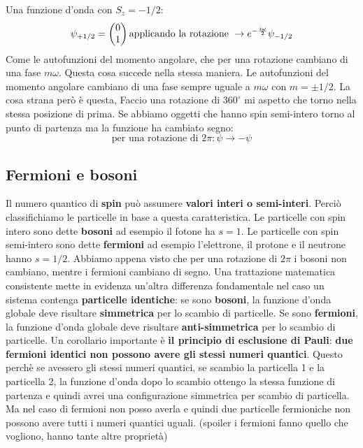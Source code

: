 Una funzione d'onda con $S_z=-1/2$: 
\begin{equation*}
    \psi_{+1/2}=\left(\begin{array}{@{}c@{}}
0 \\
1
\end{array}\right) \text{applicando la rotazione } \to e^{-\frac{i\omega}{2}} \psi_{-1/2}
\end{equation*}
Come le autofunzioni del momento angolare, che per una rotazione cambiano di una fase $m\omega$. Questa cosa succede nella stessa maniera. Le autofunzioni del momento angolare cambiano di una fase sempre uguale a $m\omega$ con $m=\pm 1/2$. La cosa strana però è questa, Faccio una rotazione di $360^\circ$ mi aspetto che torno nella stessa posizione di prima. Se abbiamo oggetti che hanno spin semi-intero torno al punto di partenza ma la funzione ha cambiato segno:
\begin{equation*}
    \text{per una rotazione di } 2\pi: \psi\to-\psi
\end{equation*}
\subsection{Fermioni e bosoni}
Il numero quantico di \textbf{spin} può assumere \textbf{valori interi o semi-interi}. Perciò classifichiamo le particelle in base a questa caratteristica. Le particelle con spin intero sono dette \textbf{bosoni} ad esempio il fotone ha $s=1$. Le particelle con spin semi-intero sono dette \textbf{fermioni} ad esempio l'elettrone, il protone e il neutrone hanno $s=1/2$. Abbiamo appena visto che per una rotazione di $2\pi$ i bosoni non cambiano, mentre i fermioni cambiano di segno. Una trattazione matematica consistente mette in evidenza un'altra differenza fondamentale nel caso un sistema contenga \textbf{particelle identiche}: se sono \textbf{bosoni}, la funzione d'onda globale deve risultare \textbf{simmetrica} per lo scambio di particelle. Se sono \textbf{fermioni}, la funzione d'onda globale deve risultare \textbf{anti-simmetrica} per lo scambio di particelle. Un corollario importante è \textbf{il principio di esclusione di Pauli}: \textbf{due fermioni identici non possono avere gli stessi numeri quantici}. Questo perchè se avessero gli stessi numeri quantici, se scambio la particella 1 e la particella 2, la funzione d'onda dopo lo scambio ottengo la stessa funzione di partenza e quindi avrei una configurazione simmetrica per scambio di particella. Ma nel caso di fermioni non posso averla e quindi due particelle fermioniche non possono avere tutti i numeri quantici uguali. (spoiler i fermioni fanno quello che vogliono, hanno tante altre proprietà)
